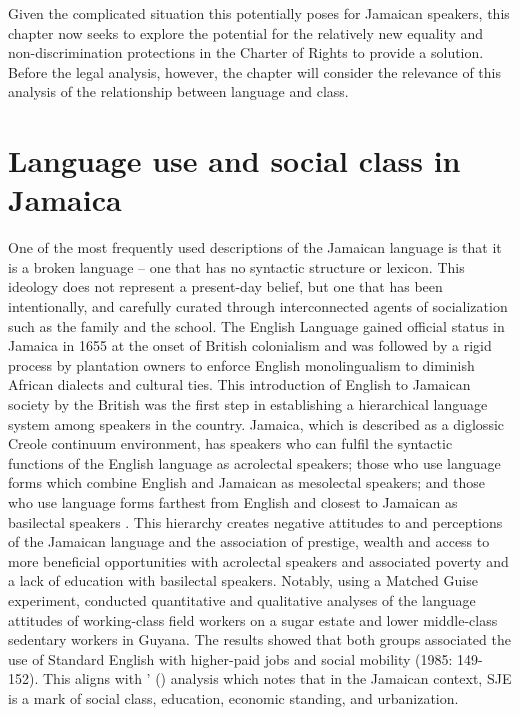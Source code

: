 \documentclass[output=paper,colorlinks,citecolor=brown]{langscibook}
\begin{document}
Given the complicated situation this potentially poses for Jamaican speakers, this chapter now seeks to explore the potential for the relatively new equality and non-discrimination protections in the Charter of Rights to provide a solution. Before the legal analysis, however, the chapter will consider the relevance of this analysis of the relationship between language and class.


\section{Language use and social class in Jamaica}


One of the most frequently used descriptions of the Jamaican language is that it is a broken language -- one that has no syntactic structure or lexicon. This ideology does not represent a present-day belief, but one that has been intentionally, and carefully curated through interconnected agents of socialization such as the family and the school. The English Language gained official status in Jamaica in 1655 at the onset of British colonialism and was followed by a rigid process by plantation owners to enforce English monolingualism to diminish African dialects and cultural ties. This introduction of English to Jamaican society by the British was the first step in establishing a hierarchical language system among speakers in the country. Jamaica, which is described as a diglossic Creole continuum environment, has speakers who can fulfil the syntactic functions of the English language as acrolectal speakers; those who use language forms which combine English and Jamaican as mesolectal speakers; and those who use language forms farthest from English and closest to Jamaican as basilectal speakers \citep{Irvine-Sobers2018}. This hierarchy creates negative attitudes to and perceptions of the Jamaican language and the association of prestige, wealth and access to more beneficial opportunities with acrolectal speakers and associated poverty and a lack of education with basilectal speakers. Notably, using a Matched Guise experiment, \citet{Rickford_1983_reprint1985} conducted quantitative and qualitative analyses of the language attitudes of working-class field workers on a sugar estate and lower middle-class sedentary workers in Guyana. The results showed that both groups associated the use of Standard English with higher-paid jobs and social mobility (1985: 149-152). This aligns with \citeauthor{Justus1978}’ (\citeyear{Justus1978}) analysis which notes that in the Jamaican context, SJE is a mark of social class, education, economic standing, and urbanization.
\end{document}
